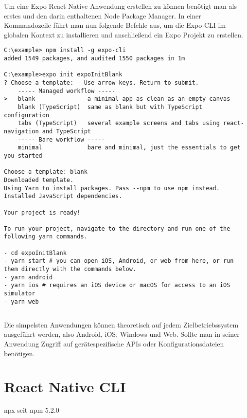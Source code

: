 Um eine Expo React Native Anwendung erstellen zu können benötigt man als erstes  und
den darin enthaltenen Node Package Manager. In einer Kommandozeile führt man nun folgende Befehle
aus, um die Expo-CLI im globalen Kontext zu installieren und anschließend ein Expo Projekt zu
erstellen.

\begin{lstlisting}
C:\example> npm install -g expo-cli
added 1549 packages, and audited 1550 packages in 1m

C:\example>expo init expoInitBlank
? Choose a template: - Use arrow-keys. Return to submit.
    ----- Managed workflow -----
>   blank               a minimal app as clean as an empty canvas
    blank (TypeScript)  same as blank but with TypeScript configuration
    tabs (TypeScript)   several example screens and tabs using react-navigation and TypeScript
    ----- Bare workflow -----
    minimal             bare and minimal, just the essentials to get you started

Choose a template: blank
Downloaded template.
Using Yarn to install packages. Pass --npm to use npm instead.
Installed JavaScript dependencies.

Your project is ready!

To run your project, navigate to the directory and run one of the following yarn commands.

- cd expoInitBlank
- yarn start # you can open iOS, Android, or web from here, or run them directly with the commands below.
- yarn android
- yarn ios # requires an iOS device or macOS for access to an iOS simulator
- yarn web
\end{lstlisting}


\subsection{}

Die simpelsten Anwendungen können theoretisch auf jedem Zielbetriebssystem ausgeführt werden, also
Android, iOS, Windows und Web. Sollte man in seiner Anwendung Zugriff auf gerätespezifische APIs
oder Konfigurationsdateien benötigen.

\section{React Native CLI}
npx seit npm 5.2.0